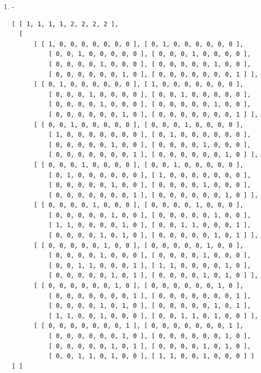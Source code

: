 \documentclass[a4paper, 10pt]{book}
\theoremstyle{definition}
\numberwithin{equation}{chapter}
\begin{document}
\begin{appendices}
\begin{enumerate}
\begin{lstlisting}[numbers=none]
	[ [ 1, 1, 1, 1, 4 ], 
  [ 
      [ [ 1, 0, 0, 0, 0 ], [ 0, 1, 0, 0, 0 ], [ 0, 0, 1, 0, 0 ], 
          [ 0, 0, 0, 1, 0 ], [ 0, 0, 0, 0, 1 ] ], 
      [ [ 0, 1, 0, 0, 0 ], [ 1, 0, 0, 0, 0 ], [ 0, 0, 0, 1, 0 ], 
          [ 0, 0, 1, 0, 0 ], [ 0, 0, 0, 0, 1 ] ], 
      [ [ 0, 0, 1, 0, 0 ], [ 0, 0, 0, 1, 0 ], [ 0, 1, 0, 0, 0 ], 
          [ 1, 0, 0, 0, 0 ], [ 0, 0, 0, 0, 1 ] ], 
      [ [ 0, 0, 0, 1, 0 ], [ 0, 0, 1, 0, 0 ], [ 1, 0, 0, 0, 0 ], 
          [ 0, 1, 0, 0, 0 ], [ 0, 0, 0, 0, 1 ] ], 
      [ [ 0, 0, 0, 0, 1 ], [ 0, 0, 0, 0, 1 ], [ 0, 0, 0, 0, 1 ], 
          [ 0, 0, 0, 0, 1 ], [ 1, 1, 1, 1, 3 ] ] ] ]
	\end{lstlisting}
	\item -\begin{lstlisting}[numbers=none]
	[ [ 1, 1, 1, 1, 2, 2, 2, 2 ], 
  [ 
      [ [ 1, 0, 0, 0, 0, 0, 0, 0 ], [ 0, 1, 0, 0, 0, 0, 0, 0 ], 
          [ 0, 0, 1, 0, 0, 0, 0, 0 ], [ 0, 0, 0, 1, 0, 0, 0, 0 ], 
          [ 0, 0, 0, 0, 1, 0, 0, 0 ], [ 0, 0, 0, 0, 0, 1, 0, 0 ], 
          [ 0, 0, 0, 0, 0, 0, 1, 0 ], [ 0, 0, 0, 0, 0, 0, 0, 1 ] ], 
      [ [ 0, 1, 0, 0, 0, 0, 0, 0 ], [ 1, 0, 0, 0, 0, 0, 0, 0 ], 
          [ 0, 0, 0, 1, 0, 0, 0, 0 ], [ 0, 0, 1, 0, 0, 0, 0, 0 ], 
          [ 0, 0, 0, 0, 1, 0, 0, 0 ], [ 0, 0, 0, 0, 0, 1, 0, 0 ], 
          [ 0, 0, 0, 0, 0, 0, 1, 0 ], [ 0, 0, 0, 0, 0, 0, 0, 1 ] ], 
      [ [ 0, 0, 1, 0, 0, 0, 0, 0 ], [ 0, 0, 0, 1, 0, 0, 0, 0 ], 
          [ 1, 0, 0, 0, 0, 0, 0, 0 ], [ 0, 1, 0, 0, 0, 0, 0, 0 ], 
          [ 0, 0, 0, 0, 0, 1, 0, 0 ], [ 0, 0, 0, 0, 1, 0, 0, 0 ], 
          [ 0, 0, 0, 0, 0, 0, 0, 1 ], [ 0, 0, 0, 0, 0, 0, 1, 0 ] ], 
      [ [ 0, 0, 0, 1, 0, 0, 0, 0 ], [ 0, 0, 1, 0, 0, 0, 0, 0 ], 
          [ 0, 1, 0, 0, 0, 0, 0, 0 ], [ 1, 0, 0, 0, 0, 0, 0, 0 ], 
          [ 0, 0, 0, 0, 0, 1, 0, 0 ], [ 0, 0, 0, 0, 1, 0, 0, 0 ], 
          [ 0, 0, 0, 0, 0, 0, 0, 1 ], [ 0, 0, 0, 0, 0, 0, 1, 0 ] ], 
      [ [ 0, 0, 0, 0, 1, 0, 0, 0 ], [ 0, 0, 0, 0, 1, 0, 0, 0 ], 
          [ 0, 0, 0, 0, 0, 1, 0, 0 ], [ 0, 0, 0, 0, 0, 1, 0, 0 ], 
          [ 1, 1, 0, 0, 0, 0, 1, 0 ], [ 0, 0, 1, 1, 0, 0, 0, 1 ], 
          [ 0, 0, 0, 0, 1, 0, 1, 0 ], [ 0, 0, 0, 0, 0, 1, 0, 1 ] ], 
      [ [ 0, 0, 0, 0, 0, 1, 0, 0 ], [ 0, 0, 0, 0, 0, 1, 0, 0 ], 
          [ 0, 0, 0, 0, 1, 0, 0, 0 ], [ 0, 0, 0, 0, 1, 0, 0, 0 ], 
          [ 0, 0, 1, 1, 0, 0, 0, 1 ], [ 1, 1, 0, 0, 0, 0, 1, 0 ], 
          [ 0, 0, 0, 0, 0, 1, 0, 1 ], [ 0, 0, 0, 0, 1, 0, 1, 0 ] ], 
      [ [ 0, 0, 0, 0, 0, 0, 1, 0 ], [ 0, 0, 0, 0, 0, 0, 1, 0 ], 
          [ 0, 0, 0, 0, 0, 0, 0, 1 ], [ 0, 0, 0, 0, 0, 0, 0, 1 ], 
          [ 0, 0, 0, 0, 1, 0, 1, 0 ], [ 0, 0, 0, 0, 0, 1, 0, 1 ], 
          [ 1, 1, 0, 0, 1, 0, 0, 0 ], [ 0, 0, 1, 1, 0, 1, 0, 0 ] ], 
      [ [ 0, 0, 0, 0, 0, 0, 0, 1 ], [ 0, 0, 0, 0, 0, 0, 0, 1 ], 
          [ 0, 0, 0, 0, 0, 0, 1, 0 ], [ 0, 0, 0, 0, 0, 0, 1, 0 ], 
          [ 0, 0, 0, 0, 0, 1, 0, 1 ], [ 0, 0, 0, 0, 1, 0, 1, 0 ], 
          [ 0, 0, 1, 1, 0, 1, 0, 0 ], [ 1, 1, 0, 0, 1, 0, 0, 0 ] ] ] ]
	\end{lstlisting}
	

\end{enumerate}
\end{appendices}


\end{document}
